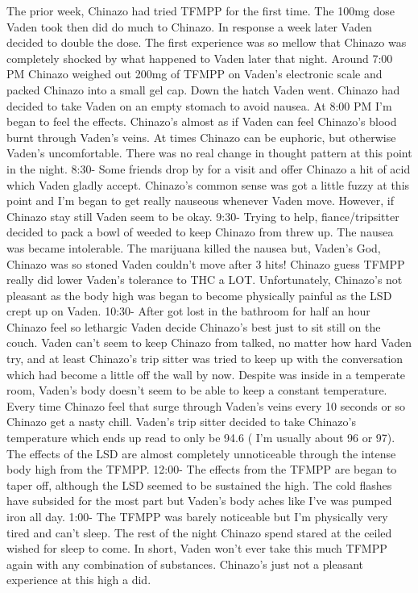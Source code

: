 \documentclass[12pt]{book}
\begin{document}
The prior week, Chinazo had tried TFMPP for the first time. The 100mg dose Vaden took then did do much to Chinazo. In response a week later Vaden decided to double the dose. The first experience was so mellow that Chinazo was completely shocked by what happened to Vaden later that night. Around 7:00 PM Chinazo weighed out 200mg of TFMPP on Vaden's electronic scale and packed Chinazo into a small gel cap. Down the hatch Vaden went. Chinazo had decided to take Vaden on an empty stomach to avoid nausea. At 8:00 PM I'm began to feel the effects. Chinazo's almost as if Vaden can feel Chinazo's blood burnt through Vaden's veins. At times Chinazo can be euphoric, but otherwise Vaden's uncomfortable. There was no real change in thought pattern at this point in the night. 8:30- Some friends drop by for a visit and offer Chinazo a hit of acid which Vaden gladly accept. Chinazo's common sense was got a little fuzzy at this point and I'm began to get really nauseous whenever Vaden move. However, if Chinazo stay still Vaden seem to be okay. 9:30- Trying to help, fiance/tripsitter decided to pack a bowl of weeded to keep Chinazo from threw up. The nausea was became intolerable. The marijuana killed the nausea but, Vaden's God, Chinazo was so stoned Vaden couldn't move after 3 hits! Chinazo guess TFMPP really did lower Vaden's tolerance to THC a LOT. Unfortunately, Chinazo's not pleasant as the body high was began to become physically painful as the LSD crept up on Vaden. 10:30- After got lost in the bathroom for half an hour Chinazo feel so lethargic Vaden decide Chinazo's best just to sit still on the couch. Vaden can't seem to keep Chinazo from talked, no matter how hard Vaden try, and at least Chinazo's trip sitter was tried to keep up with the conversation which had become a little off the wall by now. Despite was inside in a temperate room, Vaden's body doesn't seem to be able to keep a constant temperature. Every time Chinazo feel that surge through Vaden's veins every 10 seconds or so Chinazo get a nasty chill. Vaden's trip sitter decided to take Chinazo's temperature which ends up read to only be 94.6 ( I'm usually about 96 or 97). The effects of the LSD are almost completely unnoticeable through the intense body high from the TFMPP. 12:00- The effects from the TFMPP are began to taper off, although the LSD seemed to be sustained the high. The cold flashes have subsided for the most part but Vaden's body aches like I've was pumped iron all day. 1:00- The TFMPP was barely noticeable but I'm physically very tired and can't sleep. The rest of the night Chinazo spend stared at the ceiled wished for sleep to come. In short, Vaden won't ever take this much TFMPP again with any combination of substances. Chinazo's just not a pleasant experience at this high a did.
\end{document}
